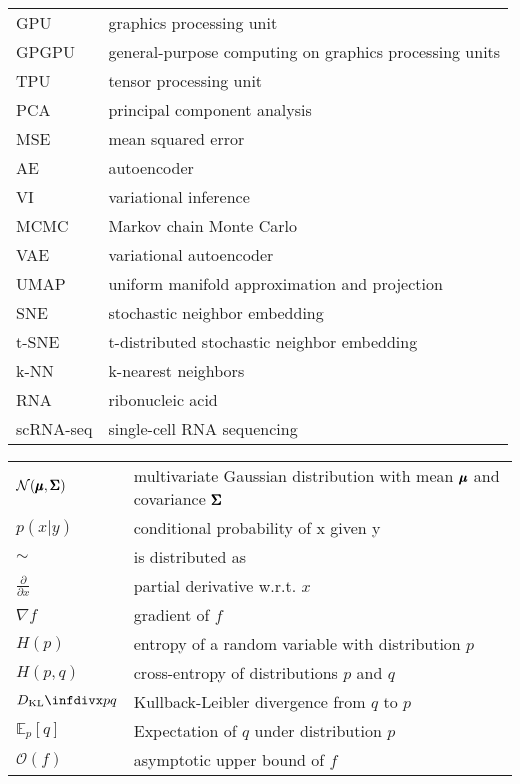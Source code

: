 \begin{tabular}[h]{@{} p{} p{} @{}}
GPU       & graphics processing unit \\
GPGPU     & general-purpose computing on graphics processing units \\
TPU       & tensor processing unit \\
PCA       & principal component analysis \\
MSE       & mean squared error \\
AE        & autoencoder \\
VI        & variational inference \\
MCMC      & Markov chain Monte Carlo \\
VAE       & variational autoencoder \\
UMAP      & uniform manifold approximation and projection \\
SNE       & stochastic neighbor embedding \\
t-SNE     & t-distributed stochastic neighbor embedding \\
k-NN      & k-nearest neighbors \\
RNA       & ribonucleic acid \\
scRNA-seq & single-cell RNA sequencing
\end{tabular}

\begin{tabular}[h]{@{} p{} p{} @{}}
$\mathcal{N}(\pmb{\mu}, \pmb{\Sigma})$  & multivariate Gaussian distribution with mean $\pmb{\mu}$ and covariance $\pmb{\Sigma}$ \\
$p(x \vert y)$                & conditional probability of x given y \\
$\sim$                        & is distributed as \\
$\frac{\partial}{\partial x}$ & partial derivative w.r.t. $x$ \\
$\nabla f$                    & gradient of $f$ \\
$H(p)$                        & entropy of a random variable with distribution $p$ \\
$H(p,q)$                      & cross-entropy of distributions $p$ and $q$ \\
$\dkl{p}{q}$                  & Kullback-Leibler divergence from $q$ to $p$ \\
$\mathbb{E}_{p}[q]$           & Expectation of $q$ under distribution $p$ \\
$\mathcal{O}(f)$              & asymptotic upper bound of $f$ \\
\end{tabular}
